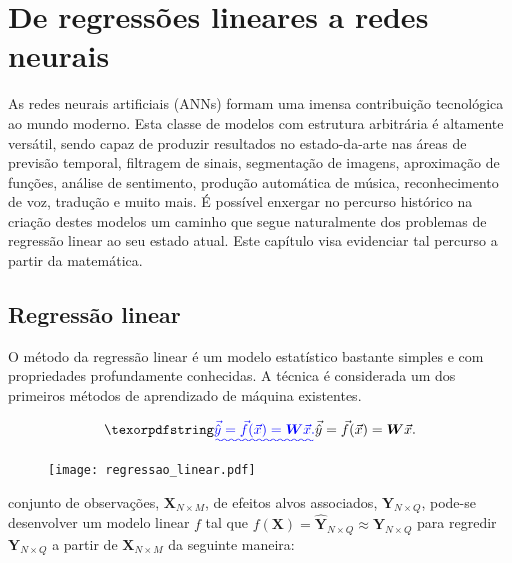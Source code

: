 \chapter{De regressões lineares a redes neurais}

  As redes neurais artificiais (ANNs) formam uma imensa contribuição tecnológica ao mundo moderno. Esta classe de modelos com estrutura arbitrária é altamente versátil, sendo capaz de produzir resultados no estado-da-arte nas áreas de previsão temporal, filtragem de sinais, segmentação de imagens, aproximação de funções, análise de sentimento, produção automática de música, reconhecimento de voz, tradução e muito mais. É possível enxergar no percurso histórico na criação destes modelos um caminho que segue naturalmente dos problemas de regressão linear ao seu estado atual. Este capítulo visa evidenciar tal percurso a partir da matemática.

  \section{Regressão linear} \label{s:reg_linear}

    O método da regressão linear é um modelo estatístico bastante simples e com propriedades profundamente conhecidas. A técnica é considerada um dos primeiros métodos de aprendizado de máquina existentes. \DIFdelbegin {}\DIFdelend \DIFaddbegin {}

    \begin{equation} \DIFadd{\label{e:reg_linear_amostra}
      \vec{\hat{y}} = \vec{f}(\vec{x}) = \boldsymbol{W} \vec{x}
      .
    }\end{equation}

    \noindent {}

    \begin{figure}
      \begin{center}
        \texttt{[image: regressao\_linear.pdf]}
      \end{center}
      \caption{}
      \label{f:regressao_linear}
    \end{figure}

    \DIFaddend conjunto de observações, $\boldsymbol{X}_{N\times M}$, \DIFdelbegin {}\DIFdelend \DIFaddbegin {}\DIFaddend de efeitos alvos \DIFaddbegin {}\DIFaddend associados, $\boldsymbol{Y}_{N\times Q}$, pode-se desenvolver um modelo linear $f$ tal que $f(\boldsymbol{X}) = \boldsymbol{\hat{Y}}_{N\times Q} \approx \boldsymbol{Y}_{N\times Q}$ para regredir $\boldsymbol{Y}_{N\times Q}$ a partir de $\boldsymbol{X}_{N\times M}$ \DIFdelbegin {}\DIFdelend da seguinte maneira:

